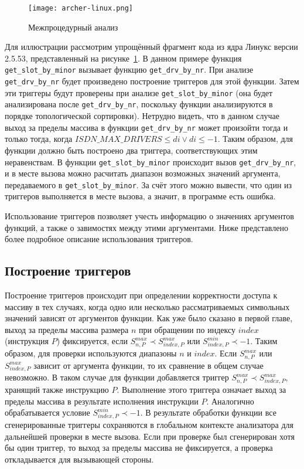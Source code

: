 \begin{figure}
    \texttt{[image: archer-linux.png]}
    \caption{Межпроцедурный анализ}
    \label{fig:archer-linux}
\end{figure}

Для иллюстрации рассмотрим упрощённый фрагмент кода из ядра Линукс
версии 2.5.53, представленный на рисунке~\ref{fig:archer-linux}. В
данном примере функция \texttt{get\_slot\_by\_minor} вызывает функцию
\texttt{get\_drv\_by\_nr}. При анализе \texttt{get\_drv\_by\_nr} будет произведено
построение триггеров для этой функции. Затем эти триггеры будут
проверены при анализе \texttt{get\_slot\_by\_minor} (она будет анализирована
после \texttt{get\_drv\_by\_nr}, поскольку функции анализируются в порядке
топологической сортировки). Нетрудно видеть, что в данном случае выход
за пределы массива в функции \texttt{get\_drv\_by\_nr} может произойти тогда
и только тогда, когда $ISDN\_MAX\_DRIVERS \leq di \vee di \leq
-1$. Таким образом, для функции должно быть построено два триггера,
соответствующих этим неравенствам. В функции \texttt{get\_slot\_by\_minor}
происходит вызов \texttt{get\_drv\_by\_nr}, и в месте вызова можно расчитать
диапазон возможных значений аргумента, передаваемого в
\texttt{get\_slot\_by\_minor}. За счёт этого можно вывести, что один из
триггеров выполняется в месте вызова, а значит, в программе есть
ошибка.

Использование триггеров позволяет учесть информацию о значениях
аргументов функций, а также о завимостях между этими аргументами. Ниже
представлено более подробное описание использования триггеров.

\subsection{Построение триггеров}

Построение триггеров происходит при определении корректности доступа к
массиву в тех случаях, когда одно или несколько рассматриваемых
символьных значений зависят от аргументов функции. Как уже было
сказано в первой главе, выход за пределы массива размера $n$ при
обращении по индексу $index$ (инструкция $P$) фиксируется, если
$S_{n, P}^{max} \prec S_{index, P}^{max}$ или
$S_{index, P}^{min} \prec -1$. Таким образом, для проверки
используются диапазоны $n$ и $index$. Если $S_{n, P}^{max}$ или
$S_{index, P}^{max}$ зависит от аргумента функции, то их сравнение в
общем случае невозможно. В таком случае для функции добавляется
триггер $S_{n, P}^{max} \prec S_{index, P}^{max}$, хранящий также
инструкцию $P$. Выполнение этого триггера означает выход за пределы
массива в результате исполнения инструкции $P$. Аналогично
обрабатывается условие $S_{index, P}^{min} \prec -1$. В результате
обработки функции все сгенерированные триггеры сохраняются в
глобальном контексте анализатора для дальнейшей проверки в месте
вызова. Если при проверке был сгенерирован хотя бы один триггер, то
выход за пределы массива не фиксируется, а проверка откладывается для
вызывающей стороны.

